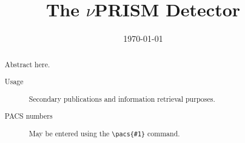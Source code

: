 \documentclass[%
preprint,
 amsmath,amssymb,
 aps,
]{revtex4-1}
\begin{document}

\title{The $\nu$PRISM Detector}%



\date{\today}%

\begin{abstract}
Abstract here.
\begin{description}
\item[Usage]
Secondary publications and information retrieval purposes.
\item[PACS numbers]
May be entered using the \verb+\pacs{#1}+ command.
\end{description}
\end{abstract}

\maketitle












\end{document}
